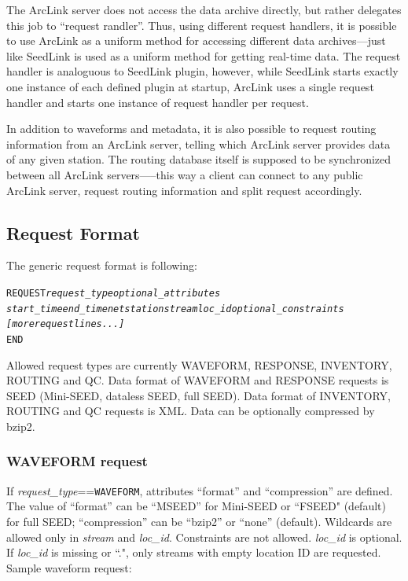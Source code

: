 \documentclass[11pt,a4paper,titlepage]{article}
\begin{document}
The ArcLink server does not access the data archive directly, but rather
delegates this job to ``request randler''. Thus, using different request
handlers, it is possible to use ArcLink as a uniform method for accessing
different data archives---just like SeedLink is used as a uniform method
for getting real-time data. The request handler is analoguous to SeedLink
plugin, however, while SeedLink starts exactly one instance of each defined
plugin at startup, ArcLink uses a single request handler and starts one
instance of request handler per request.

In addition to waveforms and metadata, it is also possible to request
routing information from an ArcLink server, telling which ArcLink server
provides data of any given station.  The routing database itself is
supposed to be synchronized between all ArcLink servers—--this way a client
can connect to any public ArcLink server, request routing information and
split request accordingly.


\subsection{Request Format}

The generic request format is following:

\begin{alltt}
REQUEST \textnormal{\emph{request\_type optional\_attributes}}
\textnormal{\emph{start\_time end\_time net station stream loc\_id optional\_constraints}}
\textnormal{\emph{[more request lines...]}}
END
\end{alltt}

Allowed request types are currently WAVEFORM, RESPONSE, INVENTORY, ROUTING
and QC. Data format of WAVEFORM and RESPONSE requests is SEED (Mini-SEED,
dataless SEED, full SEED). Data format of INVENTORY, ROUTING and QC
requests is XML. Data can be optionally compressed by bzip2.


\subsubsection{WAVEFORM request}

If \emph{request\_type}==\texttt{WAVEFORM}, attributes ``format'' and
``compression'' are defined. The value of ``format'' can be ``MSEED'' for
Mini-SEED or ``FSEED" (default) for full SEED; ``compression'' can be
``bzip2'' or ``none'' (default).  Wildcards are allowed only in
\emph{stream} and \emph{loc\_id}.  Constraints are not allowed.
\emph{loc\_id} is optional. If \emph{loc\_id} is missing or ``.", only
streams with empty location ID are requested. Sample waveform request:
\end{document}
